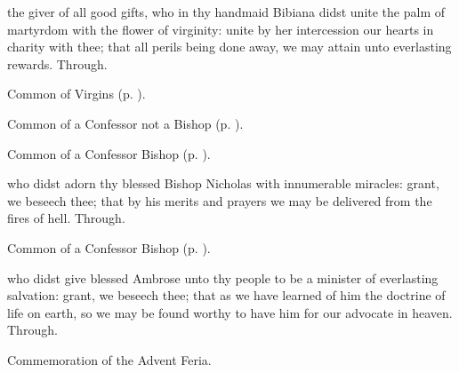 
\memorialCollect
{} the giver of all good gifts, who in thy handmaid Bibiana didst unite the palm of martyrdom with the flower of virginity: unite by her intercession our hearts in charity with thee; that all perils being done away, we may attain unto everlasting rewards. Through.



\begin{rubric}
	Common of Virgins (p. \pageref{VirginMartyressCollect}).
\end{rubric}


\clearpage
{}

\begin{rubric}
	Common of a Confessor not a Bishop (p. \pageref{AbbotCollect}).
\end{rubric}



\begin{rubric}
	Common of a Confessor Bishop (p. \pageref{CommonConfessorBishop}).
\end{rubric}

 who didst adorn thy blessed Bishop Nicholas with innumerable miracles: grant, we beseech thee; that by his merits and prayers we may be delivered from the fires of hell. Through.



\begin{rubric}
	Common of a Confessor Bishop (p. \pageref{CommonConfessorBishop}).
\end{rubric}

 who didst give blessed Ambrose unto thy people to be a minister of everlasting salvation: grant, we beseech thee; that as we have learned of him the doctrine of life on earth, so we may be found worthy to have him for our advocate in heaven. Through.

\begin{rubric}
	Commemoration of the Advent Feria.
\end{rubric}


